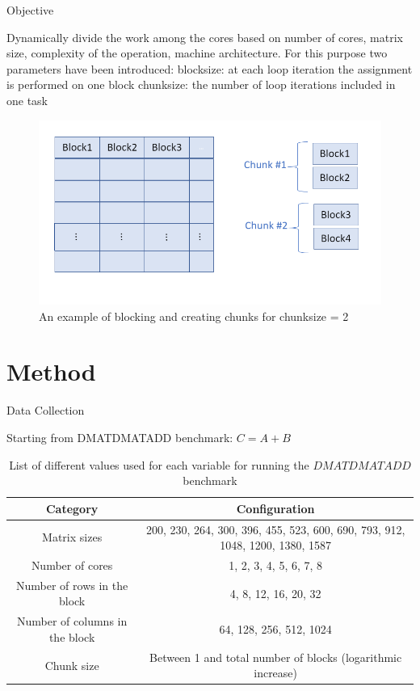\documentclass[10pt]{beamer}
\begin{document}
\begin{frame}{Objective}
	\begin{outline}
		Dynamically divide the work among the cores based on number of cores, matrix size, complexity of the operation, machine architecture.
		For this purpose two parameters have been introduced:
		\1block\textunderscore size: at each loop iteration the assignment is performed on one block
		\1chunk\textunderscore size: the number of loop iterations included in one task 
		\begin{figure}
			\centering
			\includegraphics[width=0.72\linewidth]{images/chunks.png}
			\caption{An example of blocking and creating chunks for chunk\textunderscore size = 2}	
		\end{figure}	
	\end{outline}
\end{frame}

\section{Method}
\begin{frame}{Data Collection}
	\begin{outline}
		\1Starting from DMATDMATADD benchmark: $C=A+B$
	\begin{table}[H]
		\centering
		\resizebox{\textwidth}{!}
		{\begin{tabular}{|c | c |} 
				\hline
				Category & Configuration \\
				\hline
				\hline
				Matrix sizes & 200, 230, 264, 300, 396, 455, 523, 600, 690, 793, 912, 1048, 1200, 1380, 1587 \\ [0.5ex] 
				\hline
				Number of cores & 1, 2, 3, 4, 5, 6, 7, 8 \\ 	
				\hline
				Number of rows in the block & 4, 8, 12, 16, 20, 32 \\
				\hline	
				Number of columns in the block & 64, 128, 256, 512, 1024 \\
				\hline
				Chunk size & Between 1 and total number of blocks (logarithmic increase)\\\hline
		\end{tabular}}
		
		\caption{List of different values used for each variable for running the $DMATDMATADD$ benchmark}
		\label{table1}
	\end{table}
	\end{outline}
\end{frame}
\end{document}
